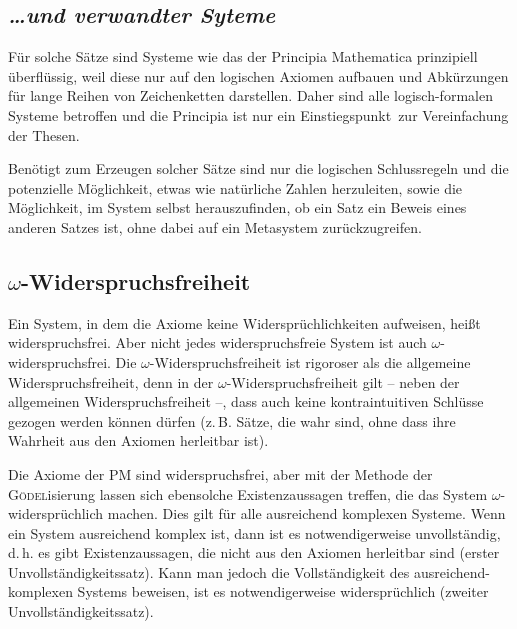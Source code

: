 \subsection*{\frq\textit{\dots und verwandter Syteme}\flq}

Für solche Sätze sind Systeme wie das der Principia Mathematica prinzipiell
überflüssig,
weil diese nur auf den logischen Axiomen aufbauen und Abkürzungen für lange Reihen von
Zeichenketten darstellen. Daher sind alle logisch-formalen Systeme betroffen und die
Principia ist nur ein \frq Einstiegspunkt\flq\ zur Vereinfachung der Thesen.

Benötigt zum Erzeugen solcher Sätze sind nur die logischen Schlussregeln und die
potenzielle Möglichkeit, etwas wie natürliche Zahlen herzuleiten, sowie die Möglichkeit,
im System selbst herauszufinden, ob ein Satz ein Beweis eines anderen Satzes ist, ohne dabei
auf ein Metasystem zurückzugreifen.

\subsection*{$\omega$-Widerspruchsfreiheit}

Ein System, in dem die Axiome keine Widersprüchlichkeiten aufweisen, heißt
\frq widerspruchsfrei\flq. Aber nicht jedes widerspruchsfreie System ist auch
$\omega$-widerspruchsfrei. Die $\omega$-Widerspruchsfreiheit ist rigoroser als
die allgemeine Widerspruchsfreiheit, denn in der $\omega$-Widerspruchsfreiheit
gilt -- neben der allgemeinen Widerspruchsfreiheit --, dass auch keine kontraintuitiven
Schlüsse gezogen werden können dürfen (z.\,B. Sätze, die wahr sind, ohne dass
ihre Wahrheit aus den Axiomen herleitbar ist).

Die Axiome der PM sind widerspruchsfrei, aber mit der Methode der \textsc{Gödel}isierung
lassen sich ebensolche Existenzaussagen treffen, die das System $\omega$-widersprüchlich
machen. Dies gilt für alle ausreichend komplexen
Systeme. Wenn ein System ausreichend komplex ist, dann ist es notwendigerweise unvollständig,
d.\,h. es gibt Existenzaussagen, die nicht aus den Axiomen herleitbar sind (erster
Unvollständigkeitssatz). Kann man jedoch die
Vollständigkeit des ausreichend-komplexen Systems beweisen, ist es notwendigerweise
widersprüchlich (zweiter Unvollständigkeitssatz).

